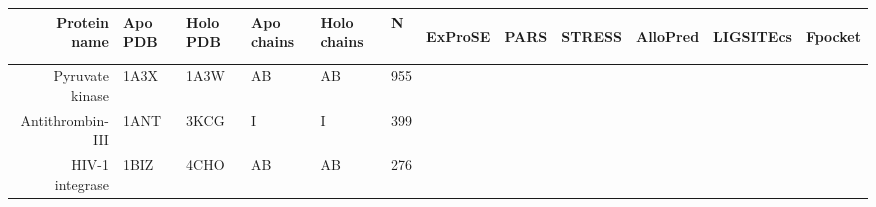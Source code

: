 \begin{table}
\centering

\begin{scriptsize}
\begin{tabular}{rrrrrrrrrrrr}
\hline
\multicolumn{1}{r}{\textbf{Protein name}} & \multicolumn{1}{l}{\textbf{Apo PDB}} & \multicolumn{1}{l}{\textbf{Holo PDB}} & \multicolumn{1}{l}{\textbf{Apo chains}} & \multicolumn{1}{l}{\textbf{Holo chains}} & \multicolumn{1}{l}{\textbf{N}} & \multicolumn{1}{l}{\begin{sideways}\textbf{ExProSE}\end{sideways}} & \multicolumn{1}{l}{\begin{sideways}\textbf{PARS}\end{sideways}} & \multicolumn{1}{l}{\begin{sideways}\textbf{STRESS}\end{sideways}} & \multicolumn{1}{l}{\begin{sideways}\textbf{AlloPred}\end{sideways}} & \multicolumn{1}{l}{\begin{sideways}\textbf{LIGSITEcs}\end{sideways}} & \multicolumn{1}{l}{\begin{sideways}\textbf{Fpocket}\end{sideways}} \\
\hline
\multicolumn{1}{r}{Pyruvate kinase} & \multicolumn{1}{l}{1A3X} & \multicolumn{1}{l}{1A3W} & \multicolumn{1}{l}{AB} & \multicolumn{1}{l}{AB} & 955   & \cellcolor[rgb]{ .573,  .816,  .314}  & \cellcolor[rgb]{ .573,  .816,  .314}  & \cellcolor[rgb]{ 1,  .494,  .475}  & \cellcolor[rgb]{ 1,  .494,  .475}  & \cellcolor[rgb]{ 1,  .494,  .475}  & \cellcolor[rgb]{ .573,  .816,  .314}  \\
\multicolumn{1}{r}{Antithrombin-III} & \multicolumn{1}{l}{1ANT} & \multicolumn{1}{l}{3KCG} & \multicolumn{1}{l}{I} & \multicolumn{1}{l}{I} & 399   & \cellcolor[rgb]{ 1,  .494,  .475}  & \cellcolor[rgb]{ 1,  .494,  .475}  & \cellcolor[rgb]{ 1,  .494,  .475}  & \cellcolor[rgb]{ 1,  .494,  .475}  & \cellcolor[rgb]{ 1,  .494,  .475}  & \cellcolor[rgb]{ 1,  .494,  .475}  \\
\multicolumn{1}{r}{HIV-1 integrase} & \multicolumn{1}{l}{1BIZ} & \multicolumn{1}{l}{4CHO} & \multicolumn{1}{l}{AB} & \multicolumn{1}{l}{AB} & 276   & \cellcolor[rgb]{ 1,  .494,  .475}  & \cellcolor[rgb]{ .573,  .816,  .314}  & \cellcolor[rgb]{ 1,  .494,  .475}  & \cellcolor[rgb]{ 1,  .494,  .475}  & \cellcolor[rgb]{ 1,  .494,  .475}  & \cellcolor[rgb]{ 1,  .494,  .475}  \\

\end{tabular}
\end{scriptsize}
\end{table}
